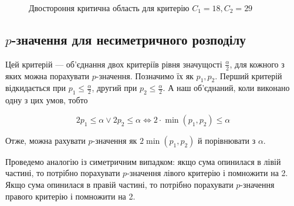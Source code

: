 \documentclass[
  letterpaper,
  10pt,
  openany]{report}
\theoremstyle{definition}
\theoremstyle{remark}
\begin{document}
\begin{figure}[H]


\caption{\label{fig-binom-pmf-two-sided-nonsym-crit}Двостороння критична
область для критерію \(C_1 = 18, C_2 = 29\)}

\end{figure}%

\subsection{\texorpdfstring{\(p\)-значення для несиметричного
розподілу}{p-значення для несиметричного розподілу}}\label{p-ux437ux43dux430ux447ux435ux43dux43dux44f-ux434ux43bux44f-ux43dux435ux441ux438ux43cux435ux442ux440ux438ux447ux43dux43eux433ux43e-ux440ux43eux437ux43fux43eux434ux456ux43bux443}

Цей критерій --- об'єднання двох критеріїв рівня значущості
\(\frac{\alpha}{2}\), для кожного з яких можна порахувати
\(p\)-значення. Позначимо їх як \(p_1, p_2\). Перший критерій
відкидається при \(p_1 \leqslant \frac{\alpha}{2}\), другий при
\(p_2 \leqslant \frac{\alpha}{2}\). А наш об'єднаний, коли виконано одну
з цих умов, тобто

\[
2p_1 \leqslant \alpha \vee 2p_2 \leqslant \alpha \Leftrightarrow 2 \cdot \min(p_1, p_2) \leqslant \alpha
\]

Отже, можна рахувати \(p\)-значення як \(2 \min(p_1, p_2)\) й
порівнювати з \(\alpha\).

Проведемо аналогію із симетричним випадком: якщо сума опинилася в лівій
частині, то потрібно порахувати \(p\)-значення лівого критерію і
помножити на 2. Якщо сума опинилася в правій частині, то потрібно
порахувати \(p\)-значення правого критерію і помножити на 2.
\end{document}
